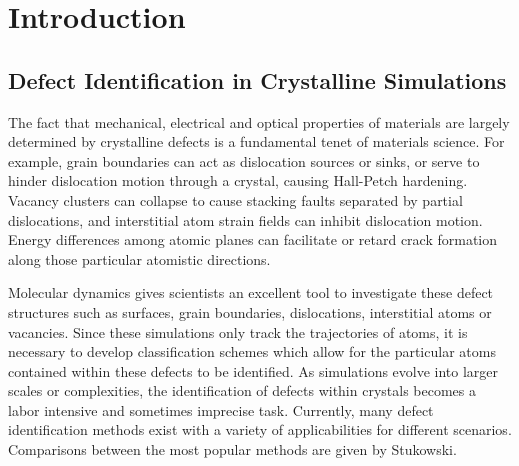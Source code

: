 \documentclass[12pt]{iopart}
\begin{document}
\section{Introduction}

\subsection{Defect Identification in Crystalline Simulations}

The fact that mechanical, electrical and optical properties of materials are largely determined by crystalline defects is a fundamental tenet of materials science. For example, grain boundaries can act as dislocation sources or sinks, or serve to hinder dislocation motion through a crystal, causing Hall-Petch hardening. Vacancy clusters can collapse to cause stacking faults separated by partial dislocations, and interstitial atom strain fields can inhibit dislocation motion. Energy differences among atomic planes can facilitate or retard crack formation along those particular atomistic directions. 

Molecular dynamics gives scientists an excellent tool to investigate these defect structures such as surfaces, grain boundaries, dislocations, interstitial atoms or vacancies. Since these simulations only track the trajectories of atoms, it is necessary to develop classification schemes which allow for the particular atoms contained within these defects to be identified. As simulations evolve into larger scales or complexities, the identification of defects within crystals becomes a labor intensive and sometimes imprecise task. Currently, many defect identification methods exist with a variety of applicabilities for different scenarios. Comparisons between the most popular methods are given by Stukowski\cite{Stukowski2012}.
\end{document}
